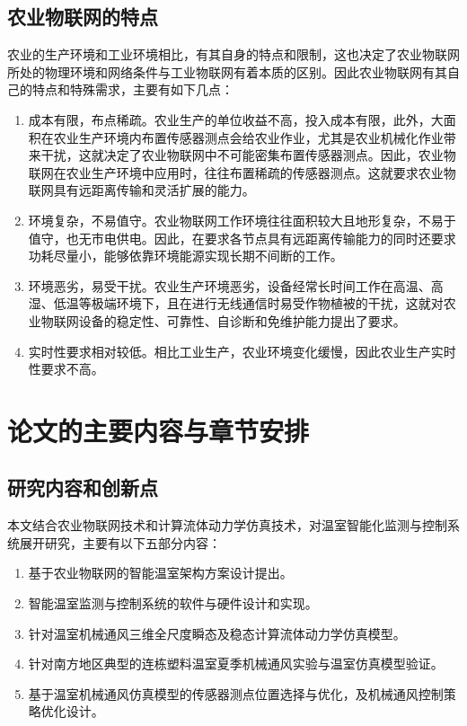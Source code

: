	\subsection{农业物联网的特点}
农业的生产环境和工业环境相比，有其自身的特点和限制，这也决定了农业物联网所处的物理环境和网络条件与工业物联网有着本质的区别。因此农业物联网有其自己的特点和特殊需求，主要有如下几点：
	\begin{enumerate}
  			\item 成本有限，布点稀疏。农业生产的单位收益不高，投入成本有限，此外，大面积在农业生产环境内布置传感器测点会给农业作业，尤其是农业机械化作业带来干扰，这就决定了农业物联网中不可能密集布置传感器测点。因此，农业物联网在农业生产环境中应用时，往往布置稀疏的传感器测点。这就要求农业物联网具有远距离传输和灵活扩展的能力。
  			\item 环境复杂，不易值守。农业物联网工作环境往往面积较大且地形复杂，不易于值守，也无市电供电。因此，在要求各节点具有远距离传输能力的同时还要求功耗尽量小，能够依靠环境能源实现长期不间断的工作。
  			\item 环境恶劣，易受干扰。农业生产环境恶劣，设备经常长时间工作在高温、高湿、低温等极端环境下，且在进行无线通信时易受作物植被的干扰，这就对农业物联网设备的稳定性、可靠性、自诊断和免维护能力提出了要求。
  			\item 实时性要求相对较低。相比工业生产，农业环境变化缓慢，因此农业生产实时性要求不高。
	\end{enumerate}


\section{论文的主要内容与章节安排}
	\subsection{研究内容和创新点}
本文结合农业物联网技术和计算流体动力学仿真技术，对温室智能化监测与控制系统展开研究，主要有以下五部分内容：
		\begin{enumerate}
			\item 基于农业物联网的智能温室架构方案设计提出。
			\item 智能温室监测与控制系统的软件与硬件设计和实现。
			\item 针对温室机械通风三维全尺度瞬态及稳态计算流体动力学仿真模型。
			\item 针对南方地区典型的连栋塑料温室夏季机械通风实验与温室仿真模型验证。
			\item 基于温室机械通风仿真模型的传感器测点位置选择与优化，及机械通风控制策略优化设计。
		\end{enumerate}
		
